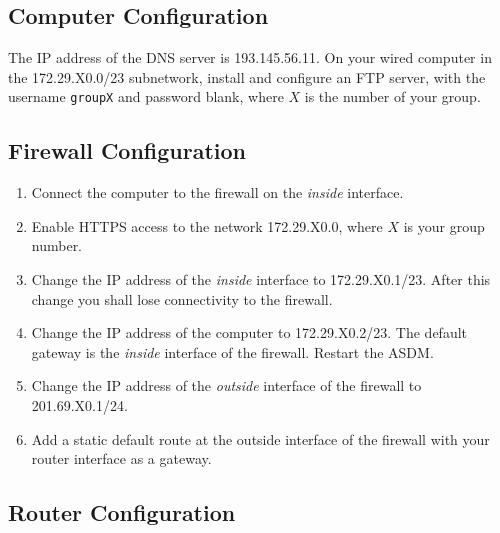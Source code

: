 \subsection{Computer Configuration}

The IP address of the DNS server is 193.145.56.11. On your wired computer in the 172.29.X0.0/23 subnetwork, install and configure an FTP server, with the username \texttt{groupX} and password blank, where $X$ is the number of your group.

\subsection{Firewall Configuration}

\begin{enumerate}
\item Connect the computer to the firewall on the \emph{inside} interface.
\item Enable HTTPS access to the network 172.29.X0.0, where $X$ is your group number.
\item Change the IP address of the \emph{inside} interface to 172.29.X0.1/23. After this change you shall lose connectivity to the firewall.
\item Change the IP address of the computer to 172.29.X0.2/23. The default gateway is the \emph{inside} interface of the firewall. Restart the ASDM.
\item Change the IP address of the \emph{outside} interface of the firewall to 201.69.X0.1/24.
\item Add a static default route at the outside interface of the firewall with your router interface as a gateway.
\end{enumerate}

\subsection{Router Configuration}

